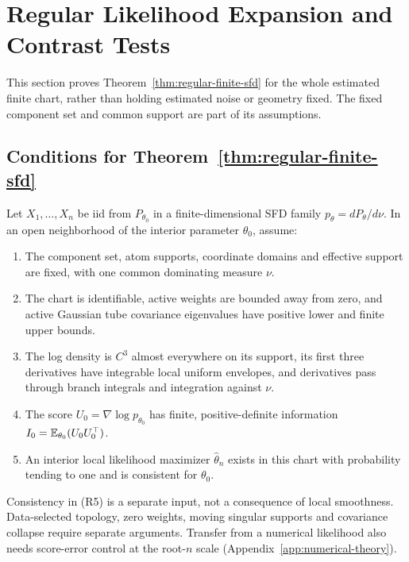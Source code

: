 \section{Regular Likelihood Expansion and Contrast Tests}
\label{app:regular-theory}
This section proves Theorem~\ref{thm:regular-finite-sfd} for the whole
estimated finite chart, rather than holding estimated noise or geometry
fixed. The fixed component set and common support are part of its assumptions.

\subsection{Conditions for Theorem~\ref{thm:regular-finite-sfd}}
\label{app:regular-conditions}
Let $X_1,\ldots,X_n$ be iid from $P_{\theta_0}$ in a finite-dimensional
SFD family $p_\theta=dP_\theta/d\nu$. In an open neighborhood of the
interior parameter $\theta_0$, assume:
\begin{enumerate}
\item[\textup{(R1)}] The component set, atom supports, coordinate domains and effective
support are fixed, with one common dominating measure $\nu$.
\item[\textup{(R2)}] The chart is identifiable, active weights are bounded away from zero,
and active Gaussian tube covariance eigenvalues have positive lower and
finite upper bounds.
\item[\textup{(R3)}] The log density is $C^3$ almost everywhere on its support, its first
three derivatives have integrable local uniform envelopes, and derivatives
pass through branch integrals and integration against $\nu$.
\item[\textup{(R4)}] The score $U_0=\nabla\log p_{\theta_0}$ has finite, positive-definite
information $I_0=\mathbb E_{\theta_0}(U_0U_0^\top)$.
\item[\textup{(R5)}] An interior local likelihood maximizer $\hat\theta_n$ exists in this
chart with probability tending to one and is consistent for $\theta_0$.
\end{enumerate}
Consistency in (R5) is a separate input, not a consequence of local
smoothness. Data-selected topology, zero weights, moving singular supports
and covariance collapse require separate arguments. Transfer from a
numerical likelihood also needs score-error control at the root-$n$ scale
(Appendix~\ref{app:numerical-theory}).

